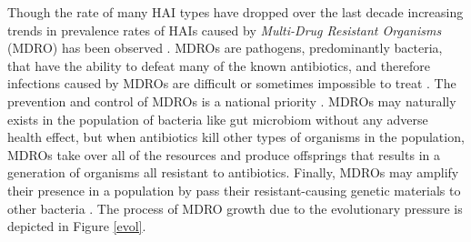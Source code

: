
Though the rate of many HAI types have dropped over the last decade \cite{progress} increasing trends in prevalence rates of HAIs caused by \emph{Multi-Drug Resistant Organisms} (MDRO) has been observed \cite{balkhair2014epidemiology, actionplan}. MDROs are pathogens, predominantly bacteria, that have the ability to defeat many of the known antibiotics, and therefore infections caused by MDROs are difficult or sometimes impossible to treat \cite{siegel2007management}. The prevention and control of MDROs is a national priority \cite{lederberg1998antimicrobial, shlaes1997society}. MDROs may naturally exists in the population of bacteria like gut microbiom without any adverse health effect, but when antibiotics kill other types of organisms in the population, MDROs take over all of the resources and produce offsprings that results in a generation of organisms all resistant to antibiotics. Finally, MDROs may amplify their presence in a population by pass their resistant-causing genetic materials to other bacteria \cite{resistance}. The process of MDRO growth due to the evolutionary pressure is depicted in Figure \ref{evol}.


